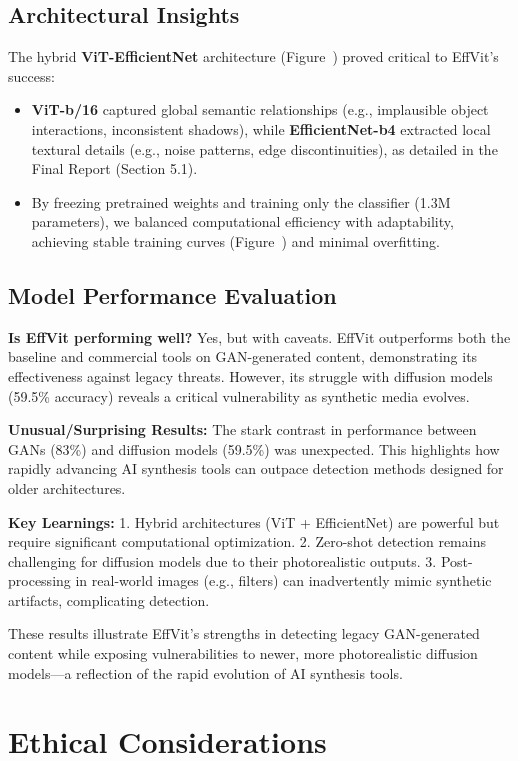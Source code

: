 \documentclass{article} %
\begin{document}
\subsection{Architectural Insights}
The hybrid \textbf{ViT-EfficientNet} architecture (Figure~) proved critical to EffVit's success:
\begin{itemize}
    \item \textbf{ViT-b/16} captured global semantic relationships (e.g., implausible object interactions, inconsistent shadows), while \textbf{EfficientNet-b4} extracted local textural details (e.g., noise patterns, edge discontinuities), as detailed in the Final Report (Section 5.1).
    \item By freezing pretrained weights and training only the classifier (1.3M parameters), we balanced computational efficiency with adaptability, achieving stable training curves (Figure~) and minimal overfitting.
\end{itemize}

\subsection{Model Performance Evaluation}
\textbf{Is EffVit performing well?}
Yes, but with caveats. EffVit outperforms both the baseline and commercial tools on GAN-generated content, demonstrating its effectiveness against legacy threats. However, its struggle with diffusion models (59.5\% accuracy) reveals a critical vulnerability as synthetic media evolves.

\textbf{Unusual/Surprising Results:}
The stark contrast in performance between GANs (83\%) and diffusion models (59.5\%) was unexpected. This highlights how rapidly advancing AI synthesis tools can outpace detection methods designed for older architectures.

\textbf{Key Learnings:}
1. Hybrid architectures (ViT + EfficientNet) are powerful but require significant computational optimization.
2. Zero-shot detection remains challenging for diffusion models due to their photorealistic outputs.
3. Post-processing in real-world images (e.g., filters) can inadvertently mimic synthetic artifacts, complicating detection.

These results illustrate EffVit's strengths in detecting legacy GAN-generated content while exposing vulnerabilities to newer, more photorealistic diffusion models—a reflection of the rapid evolution of AI synthesis tools.

\section{Ethical Considerations}
\end{document}

